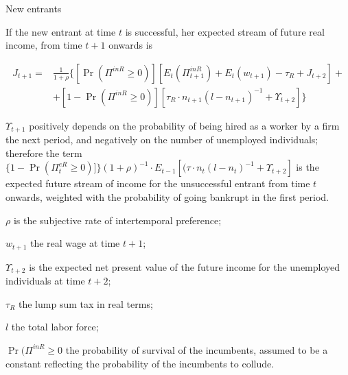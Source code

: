 \documentclass[9pt]{beamer}
\begin{document}
\begin{frame}{New entrants}

If the new entrant at time $t$ is successful, her expected stream of future
real income, from time $t+1$ onwards is

\begin{equation}
\begin{aligned}
J_{t+1} = & \frac{1}{1+\rho }\{[\Pr (\Pi ^{inR}\geq 0)][E_{t}(\Pi
_{t+1}^{inR})+E_{t}(w_{t+1})-\tau _{R}+J_{t+2}]+ \\
& +[1-\Pr (\Pi ^{inR} \geq 0)][\tau _{R}\cdot n_{t+1}\left( l-n_{t+1}\right)
^{-1}+\Upsilon _{t+2}]\}
\end{aligned}
\end{equation}

$\Upsilon _{t+1}$ positively depends on the probability of being hired as
a worker by a firm the next period, and negatively on the number of
unemployed individuals; therefore the term $\{1-\Pr (\Pi _{t}^{eR}\geq
0)]\}(1+\rho )^{-1}\cdot E_{t-1}[(\tau \cdot n_{t}\left( l-n_{t}\right)
^{-1}+\Upsilon _{t+2}]$ is the expected future stream of income for the
unsuccessful entrant from time $t$ onwards, weighted with the probability of
going bankrupt in the first period.

\bigskip
\footnotesize
$\rho$ is the subjective rate of intertemporal preference;

$w_{t+1}$ the real wage at time $t+1$;

$\Upsilon _{t+2}$ is the expected net present value of the future income for the unemployed individuals at time $t+2$;

$\tau _{R}$ the lump sum tax in real terms; 
 
 $l$ the total labor force; 
 
 $\Pr (\Pi ^{inR}\geq 0$ the probability of survival of the incumbents, assumed to be a constant reflecting the probability of the incumbents to collude.


\end{frame}
\end{document}
